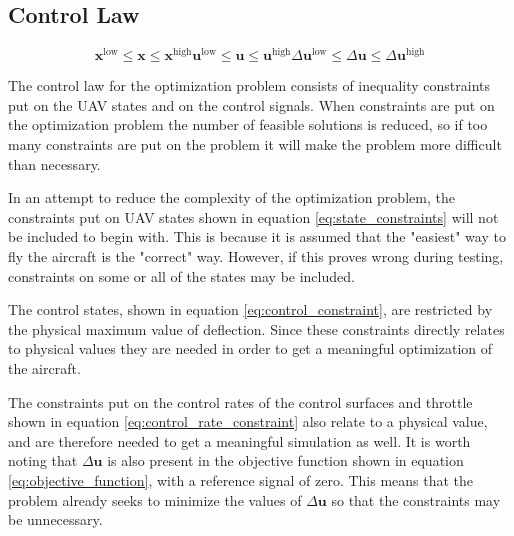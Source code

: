 \subsection{Control Law}

\begin{subequations}
\begin{equation}
	\label{eq:state_constraints}
	\mathbf{x}^{\text{low}} \leq \mathbf{x} \leq \mathbf{x}^{\text{high}}
\end{equation}
\begin{equation}
	\label{eq:control_constraint}
	\mathbf{u}^{\text{low}} \leq \mathbf{u} \leq \mathbf{u}^{\text{high}}
\end{equation}
\begin{equation}
	\label{eq:control_rate_constraint}
	\Delta\mathbf{u}^{\text{low}} \leq \Delta\mathbf{u} \leq \Delta\mathbf{u}^{\text{high}}
\end{equation}
\end{subequations}

The control law for the optimization problem consists of inequality constraints put on the UAV states and on the control signals. When constraints are put on the optimization problem the number of feasible solutions is reduced, so if too many constraints are put on the problem it will make the problem more difficult than necessary.

In an attempt to reduce the complexity of the optimization problem, the constraints put on UAV states shown in equation \ref{eq:state_constraints} will not be included to begin with. This is because it is assumed that the "easiest" way to fly the aircraft is the "correct" way. However, if this proves wrong during testing, constraints on some or all of the states may be included.

The control states, shown in equation \ref{eq:control_constraint}, are restricted by the physical maximum value of deflection. Since these constraints directly relates to physical values they are needed in order to get a meaningful optimization of the aircraft.

The constraints put on the control rates of the control surfaces and throttle shown in equation \ref{eq:control_rate_constraint} also relate to a physical value, and are therefore needed to get a meaningful simulation as well. It is worth noting that $\Delta\mathbf{u}$ is also present in the objective function shown in equation \ref{eq:objective_function}, with a reference signal of zero. This means that the problem already seeks to minimize the values of $\Delta\mathbf{u}$ so that the constraints may be unnecessary.